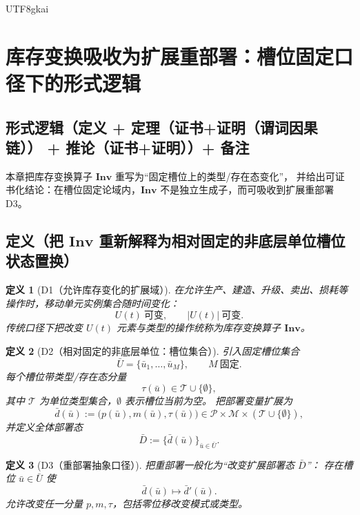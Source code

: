 \documentclass[12pt]{article}
\newtheorem{definition}{定义}[section]
\begin{document}
\begin{CJK*}{UTF8}{gkai}
\section{库存变换吸收为扩展重部署：槽位固定口径下的形式逻辑}
\label{sec:tex28-ch17}

\subsection{形式逻辑（定义 + 定理（证书+证明（谓词因果链）） + 推论（证书+证明））+ 备注}
\label{subsec:tex28-ch17-logic}
本章把库存变换算子 $\mathbf{Inv}$ 重写为“固定槽位上的类型/存在态变化”，
并给出可证书化结论：在槽位固定论域内，$\mathbf{Inv}$ 不是独立生成子，而可吸收到扩展重部署 D3。

\subsection{定义（把 $\mathbf{Inv}$ 重新解释为相对固定的非底层单位槽位状态置换）}
\label{subsec:tex28-ch17-defs}

\begin{definition}[D1（允许库存变化的扩展域）]
\label{def:tex28-ch17-d1}
在允许生产、建造、升级、卖出、损耗等操作时，移动单元实例集合随时间变化：
\[
  U(t)\ \text{可变},\qquad |U(t)|\ \text{可变}.
\]
传统口径下把改变 $U(t)$ 元素与类型的操作统称为库存变换算子 $\mathbf{Inv}$。
\end{definition}

\begin{definition}[D2（相对固定的非底层单位：槽位集合）]
\label{def:tex28-ch17-d2}
引入固定槽位集合
\[
  \bar U=\{\bar u_1,\dots,\bar u_M\},\qquad M\ \text{固定}.
\]
每个槽位带类型/存在态分量
\[
  \tau(\bar u)\in\mathcal T\cup\{\emptyset\},
\]
其中 $\mathcal T$ 为单位类型集合，$\emptyset$ 表示槽位当前为空。
把部署变量扩展为
\[
  \bar d(\bar u):=\bigl(p(\bar u),m(\bar u),\tau(\bar u)\bigr)
  \in\mathcal P\times\mathcal M\times(\mathcal T\cup\{\emptyset\}),
\]
并定义全体部署态
\[
  \bar D:=\{\bar d(\bar u)\}_{\bar u\in\bar U}.
\]
\end{definition}

\begin{definition}[D3（重部署抽象口径）]
\label{def:tex28-ch17-d3}
把重部署一般化为“改变扩展部署态 $\bar D$”：
存在槽位 $\bar u\in\bar U$ 使
\[
  \bar d(\bar u)\mapsto \bar d'(\bar u).
\]
允许改变任一分量 $p,m,\tau$，包括零位移改变模式或类型。
\end{definition}


\end{CJK*}
\end{document}
